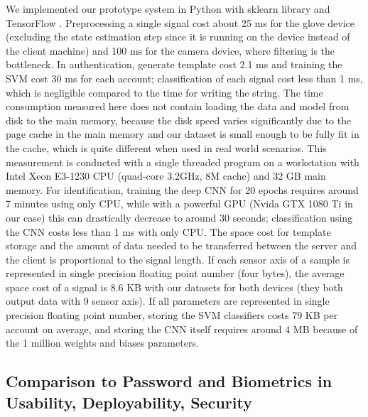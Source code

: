 \documentclass[conference]{IEEEtran}
\begin{document}
We implemented our prototype system in Python with sklearn library and TensorFlow \cite{TensorFlow}. Preprocessing a single signal cost about 25 ms for the glove device (excluding the state estimation step since it is running on the device instead of the client machine) and 100 ms for the camera device, where filtering is the bottleneck. In authentication, generate template cost 2.1 ms and training the SVM cost 30 ms for each account; classification of each signal cost less than 1 ms, which is negligible compared to the time for writing the string. The time consumption measured here does not contain loading the data and model from disk to the main memory, because the disk speed varies significantly due to the page cache in the main memory and our dataset is small enough to be fully fit in the cache, which is quite different when used in real world scenarios. This measurement is conducted with a single threaded program on a workstation with Intel Xeon E3-1230 CPU (quad-core 3.2GHz, 8M cache) and 32 GB main memory. For identification, training the deep CNN for 20 epochs requires around 7 minutes using only CPU, while with a powerful GPU (Nvida GTX 1080 Ti in our case) this can drastically decrease to around 30 seconds; classification using the CNN costs less than 1 ms with only CPU. The space cost for template storage and the amount of data needed to be transferred between the server and the client is proportional to the signal length. If each sensor axis of a sample is represented in single precision floating point number (four bytes), the average space cost of a signal is 8.6 KB with our datasets for both devices (they both output data with 9 sensor axis). If all parameters are represented in single precision floating point number, storing the SVM classifiers costs 79 KB per account on average, and storing the CNN itself requires around 4 MB because of the 1 million weights and biases parameters.



\subsection{Comparison to Password and Biometrics in Usability, Deployability, Security}
\end{document}
